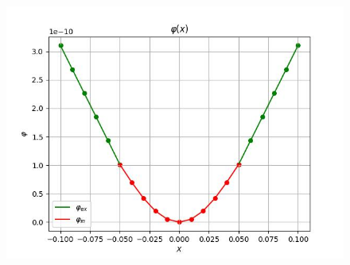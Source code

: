 \documentclass[a4paper,12pt]{article}
\begin{document}
\begin{figure}[h!]
\begin{minipage}[h]{0.55\linewidth}
			\includegraphics[width=1\linewidth]{Prt sc/Figure_3.jpeg}
		\end{minipage}
	\end{figure}
	
	
	
	
	
	
	
	
	
	
	
	
	
	
	
\end{document}
